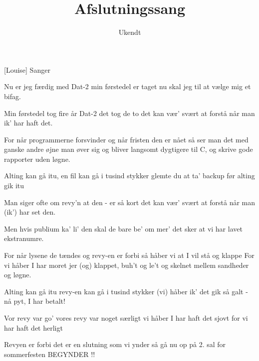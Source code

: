 \documentclass[a4paper,11pt]{article}
\title{Afslutningssang}
\author{Ukendt}
\begin{document}
\maketitle

\begin{roles}
[Louise] Sanger 
\end{roles}

\begin{song}
   Nu er jeg færdig med Dat-2
            min førstedel er taget
            nu skal jeg til at
            vælge mig et bifag.

            Min førstedel tog fire år
            Dat-2 det tog de to
            det kan vær' svært at forstå
            når man ik' har haft det.

            For når programmerne forsvinder
            og når fristen den er nået
            så ser man det med ganske andre øjne
            man øver sig og bliver langsomt
            dygtigere til C,
            og skrive gode rapporter uden løgne.

            Alting kan gå itu,
            en fil kan gå i tusind stykker
            glemte du at ta' backup
            før alting gik itu


  Man siger ofte om revy'n
           at den - er så kort
           det kan vær' svært at forstå
           når man (ik') har set den.

           Men hvis publium ka' li' den
           skal de bare be' om mer'
           det sker at vi
           har lavet ekstranumre.

           For når lysene de tændes
           og revy-en er forbi
           så håber vi at I vil stå og klappe
           For vi håber I har moret jer
           (og) klappet, buh't og le't
           og skelnet mellem sandheder og løgne.


   Alting kan gå itu
               revy-en kan gå i tusind stykker
               (vi) håber ik' det gik så galt
               - nå pyt, I har betalt!
             
               Vor revy var go'
               vores revy var noget særligt
               vi håber I har haft det sjovt
               for vi har haft det herligt

               Revyen er forbi
               det er en slutning som vi ynder
               så gå nu op på 2. sal
               for sommerfesten BEGYNDER !!

\end{song}
\end{document}
